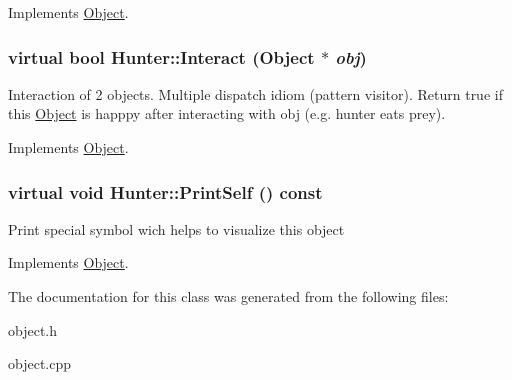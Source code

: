 Implements \hyperlink{classObject_a70097e3ad4433aec0dd0b938fcedfeca}{Object}.

\hypertarget{classHunter_aad1bd13407503496a74ae1a6c689e64f}{
\subsubsection[{Interact}]{\setlength{\rightskip}{0pt plus 5cm}virtual bool Hunter::Interact ({\bf Object} $\ast$ {\em obj})}}
\label{classHunter_aad1bd13407503496a74ae1a6c689e64f}
Interaction of 2 objects. Multiple dispatch idiom (pattern visitor). Return true if this \hyperlink{classObject}{Object} is happpy after interacting with obj (e.g. hunter eats prey). 

Implements \hyperlink{classObject_a27d03e80827229de2ce885a0bc1c83c0}{Object}.

\hypertarget{classHunter_a9b193792622fd203df15bf755753e9bd}{
\subsubsection[{PrintSelf}]{\setlength{\rightskip}{0pt plus 5cm}virtual void Hunter::PrintSelf () const}}
\label{classHunter_a9b193792622fd203df15bf755753e9bd}
Print special symbol wich helps to visualize this object 

Implements \hyperlink{classObject_a2c63e79dfa8626451b4a04b0b72294eb}{Object}.



The documentation for this class was generated from the following files:\begin{DoxyCompactItemize}
\item 
object.h\item 
object.cpp\end{DoxyCompactItemize}
